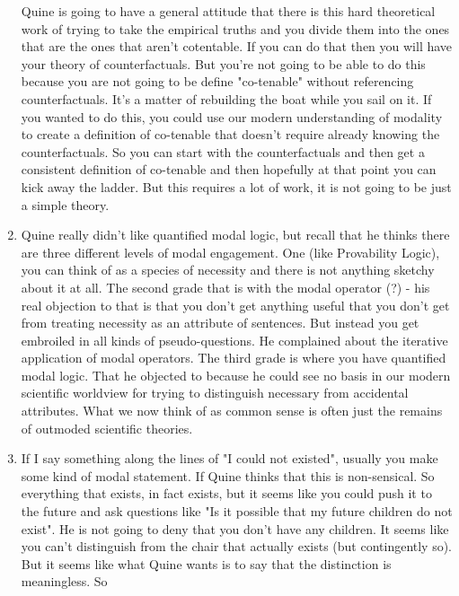 \documentclass[12pt]{article}
\theoremstyle{definition}
\begin{document}
\begin{enumerate}
        Quine is going to have a general attitude that there is this hard
        theoretical work of trying to take the empirical truths and you divide
        them into the ones that are the ones that aren't cotentable. If you can
        do that then you will have your theory of counterfactuals. But you're
        not going to be able to do this because you are not going to be define
        "co-tenable" without referencing counterfactuals. It's a matter of
        rebuilding the boat while you sail on it. If you wanted to do this, you
        could use our modern understanding of modality to create a definition
        of co-tenable that doesn't require already knowing the counterfactuals.
        So you can start with the counterfactuals and then get a consistent
        definition of co-tenable and then hopefully at that point you can kick
        away the ladder. But this requires a lot of work, it is not going to be
        just a simple theory.
    \item
        Quine really didn't like quantified modal logic, but recall that he
        thinks there are three different levels of modal engagement. One (like
        Provability Logic), you can think of as a species of necessity and
        there is not anything sketchy about it at all. The second grade that is
        with the modal operator (?) - his real objection to that is that you
        don't get anything useful that you don't get from treating necessity as
        an attribute of sentences. But instead you get embroiled in all kinds
        of pseudo-questions. He complained about the iterative application of
        modal operators. The third grade is where you have quantified modal
        logic. That he objected to because he could see no basis in our modern
        scientific worldview for trying to distinguish necessary from
        accidental attributes. What we now think of as common sense is often
        just the remains of outmoded scientific theories.
    \item
        If I say something along the lines of "I could not existed", usually
        you make some kind of modal statement. If Quine thinks that this is
        non-sensical. So everything that exists, in fact exists, but it seems
        like you could push it to the future and ask questions like "Is it
        possible that my future children do not exist". He is not going to deny
        that you don't have any children. It seems like you can't distinguish
        from the chair that actually exists (but contingently so). But it seems
        like what Quine wants is to say that the distinction is meaningless. So

\end{enumerate}
\end{document}

